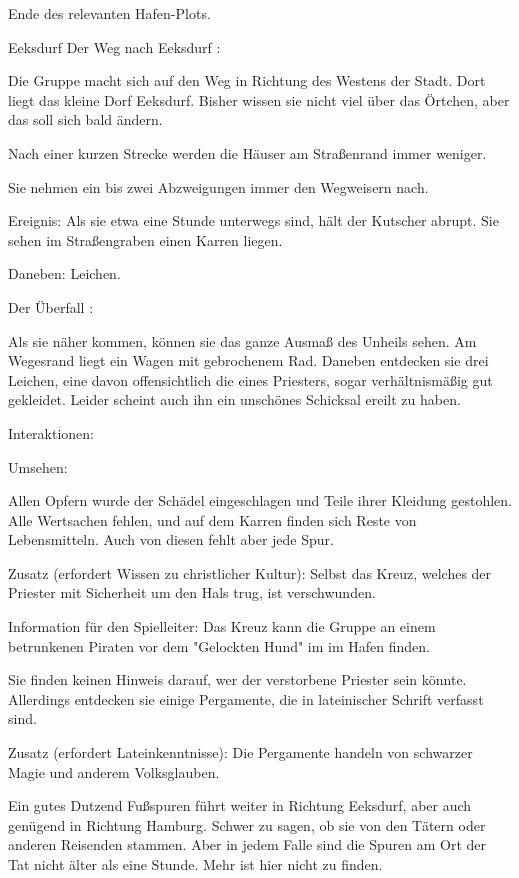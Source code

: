 Ende des relevanten Hafen-Plots.

Eeksdurf
Der Weg nach Eeksdurf
:

Die Gruppe macht sich auf den Weg in Richtung des Westens der Stadt. Dort liegt das kleine Dorf Eeksdurf. Bisher wissen sie nicht viel über das Örtchen, aber das soll sich bald ändern.

Nach einer kurzen Strecke werden die Häuser am Straßenrand immer weniger.

Sie nehmen ein bis zwei Abzweigungen immer den Wegweisern nach.

Ereignis: Als sie etwa eine Stunde unterwegs sind, hält der Kutscher abrupt. Sie sehen im Straßengraben einen Karren liegen.

Daneben: Leichen.


Der Überfall
:

Als sie näher kommen, können sie das ganze Ausmaß des Unheils sehen. Am Wegesrand liegt ein Wagen mit gebrochenem Rad. Daneben entdecken sie drei Leichen, eine davon offensichtlich die eines Priesters, sogar verhältnismäßig gut gekleidet. Leider scheint auch ihn ein unschönes Schicksal ereilt zu haben.

Interaktionen:

Umsehen:

Allen Opfern wurde der Schädel eingeschlagen und Teile ihrer Kleidung gestohlen.
Alle Wertsachen fehlen, und auf dem Karren finden sich Reste von Lebensmitteln. Auch von diesen fehlt aber jede Spur.

Zusatz (erfordert Wissen zu christlicher Kultur): Selbst das Kreuz, welches der Priester mit Sicherheit um den Hals trug, ist verschwunden.

Information für den Spielleiter: Das Kreuz kann die Gruppe an einem betrunkenen Piraten vor dem "Gelockten Hund" im im Hafen finden.

Sie finden keinen Hinweis darauf, wer der verstorbene Priester sein könnte. Allerdings entdecken sie einige Pergamente, die in lateinischer Schrift verfasst sind.

Zusatz (erfordert Lateinkenntnisse): Die Pergamente handeln von schwarzer Magie und anderem Volksglauben.

Ein gutes Dutzend Fußspuren führt weiter in Richtung Eeksdurf, aber auch genügend in Richtung Hamburg. Schwer zu sagen, ob sie von den Tätern oder anderen Reisenden stammen. Aber in jedem Falle sind die Spuren am Ort der Tat nicht älter als eine Stunde. Mehr ist hier nicht zu finden.

